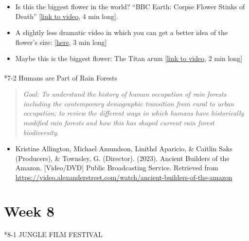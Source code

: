 \documentclass[
  10pt,
  letterpaper,
  oneside,
  open=any]{scrbook}
\makeatletter
\let\oldparagraph\paragraph
\renewcommand{\paragraph}{
    \@ifstar
      \xxxParagraphStar
      \xxxParagraphNoStar
  }
\newcommand{\xxxParagraphStar}[1]{\oldparagraph*{#1}\mbox{}}
\newcommand{\xxxParagraphNoStar}[1]{\oldparagraph{#1}\mbox{}}
\providecommand{\tightlist}{%
  \setlength{\itemsep}{0pt}\setlength{\parskip}{0pt}}
\makeatother
\begin{document}
\begin{itemize}
\item
  Is this the biggest flower in the world? ``BBC Earth: Corpse Flower
  Stinks of Death''
  {[}\href{https://www.youtube.com/watch?v=YxIpl38rsMo}{link to video},
  4 min long{]}.
\item
  A slightly less dramatic video in which you can get a better idea of
  the flower's size:
  {[}\href{https://www.youtube.com/watch?v=0cGRujABwuQ}{here}, 3 min
  long{]}
\item
  Maybe this is the biggest flower: The Titan arum
  {[}\href{https://www.youtube.com/watch?v=5Jg-GlCXpEI}{link to video},
  2 min long{]}
\end{itemize}

\paragraph*{7-2 Humans are Part of Rain
Forests}\label{humans-are-part-of-rain-forests}

\begin{quote}
\emph{Goal: To understand the history of human occupation of rain
forests including the contemporary demographic transition from rural to
urban occupation; to review the different ways in which humans have
historically modified rain forests and how this has shaped current rain
forest biodiversity.}
\end{quote}

\begin{itemize}
\tightlist
\item
  Kristine Allington, Michael Amundson, Linithd Aparicio, \& Caitlin
  Saks (Producers), \& Townsley, G. (Director). (2023). Ancient Builders
  of the Amazon. {[}Video/DVD{]} Public Broadcasting Service. Retrieved
  from
  \url{https://video.alexanderstreet.com/watch/ancient-builders-of-the-amazon}
\end{itemize}

\section*{Week 8}\label{week-8}


\paragraph*{8-1 JUNGLE FILM FESTIVAL}\label{jungle-film-festival}
\end{document}
